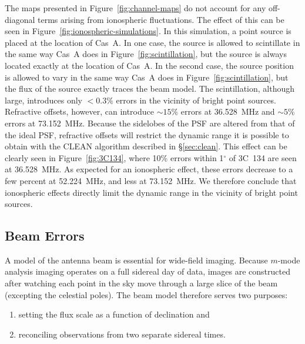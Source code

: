 \documentclass[twocolumn]{aastex61}
\begin{document}
The maps presented in Figure~\ref{fig:channel-maps} do not account for any off-diagonal terms
arising from ionospheric fluctuations. The effect of this can be seen in
Figure~\ref{fig:ionospheric-simulations}. In this simulation, a point source is placed at the
location of Cas~A. In one case, the source is allowed to scintillate in the same way Cas~A does in
Figure~\ref{fig:scintillation}, but the source is always located exactly at the location of Cas~A.
In the second case, the source position is allowed to vary in the same way Cas~A does in
Figure~\ref{fig:scintillation}, but the flux of the source exactly traces the beam model. The
scintillation, although large, introduces only $<0.3\%$ errors in the vicinity of bright point
sources. Refractive offsets, however, can introduce $\sim 15\%$ errors at 36.528~MHz and $\sim 5\%$
errors at 73.152~MHz.  Because the sidelobes of the PSF are altered from that of the ideal PSF,
refractive offsets will restrict the dynamic range it is possible to obtain with the CLEAN algorithm
described in \S\ref{sec:clean}. This effect can be clearly seen in Figure~\ref{fig:3C134}, where
10\% errors within 1$^\circ$ of 3C~134 are seen at 36.528~MHz.  As expected for an ionospheric
effect, these errors decrease to a few percent at 52.224~MHz, and less at 73.152~MHz. We therefore
conclude that ionospheric effects directly limit the dynamic range in the vicinity of bright point
sources.

\subsection{Beam Errors}

A model of the antenna beam is essential for wide-field imaging. Because $m$-mode analysis imaging
operates on a full sidereal day of data, images are constructed after watching each point in the sky
move through a large slice of the beam (excepting the celestial poles). The beam model therefore
serves two purposes:
\begin{enumerate}
    \item setting the flux scale as a function of declination and
    \item reconciling observations from two separate sidereal times.
\end{enumerate}
\end{document}
